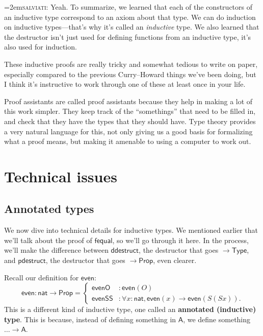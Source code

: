 \documentclass[11pt,paper=letter]{scrartcl}
\newcommand{\sf}{\mathsf}
\newcommand{\salv}{\vspace{0.5em}\noindent\hangindent=2em\textsc{salviati:} }
\newcommand{\prop}{\mathsf{Prop}}
\newcommand{\type}{\mathsf{Type}}
\begin{document}
\salv Yeah. To summarize, we learned that each of the constructors of an inductive type correspond to an axiom about that type. We can do induction on inductive types---that's why it's called an \emph{inductive} type. We also learned that the destructor isn't just used for defining functions from an inductive type, it's also used for induction.

\vspace{0.5em}

These inductive proofs are really tricky and somewhat tedious to write on paper, especially compared to the previous Curry–Howard things we've been doing, but I think it's instructive to work through one of these at least once in your life.

Proof assistants are called proof assistants because they help in making a lot of this work simpler. They keep track of the ``somethings'' that need to be filled in, and check that they have the types that they should have. Type theory provides a very natural language for this, not only giving us a good basis for formalizing what a proof means, but making it amenable to using a computer to work out.

\clearpage

\section{Technical issues}

\subsection{Annotated types}

We now dive into technical details for inductive types. We mentioned earlier that we'll talk about the proof of $\sf{fequal}$, so we'll go through it here. In the process, we'll make the difference between $\sf{ddestruct}$, the destructor that goes $\to \type$, and $\sf{pdestruct}$, the destructor that goes $\to \prop$, even clearer.

Recall our definition for $\sf{even}$: \[
  \sf{even} : \sf{nat} \to \prop = \begin{cases}
    \sf{evenO} &: \sf{even}(O) \\
    \sf{evenSS} &: \forall x: \sf{nat}, \sf{even}(x) \to \sf{even}(S(Sx)).
  \end{cases}
\]
This is a different kind of inductive type, one called an \textbf{annotated (inductive) type}. This is because, instead of defining something in $\sf{A}$, we define something $\dots \to \sf{A}$.
\end{document}
